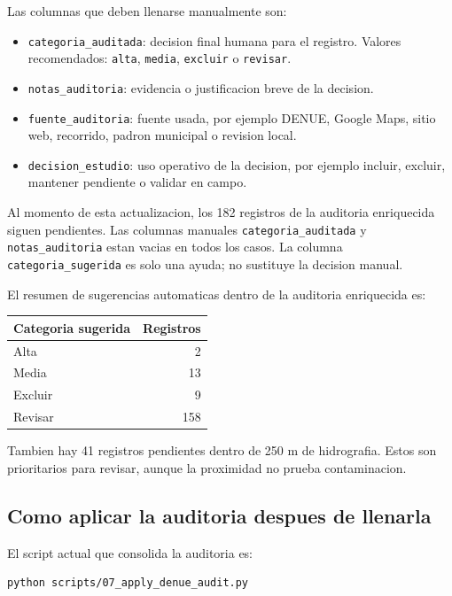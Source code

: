 \documentclass[11pt,letterpaper]{article}
\begin{document}
Las columnas que deben llenarse manualmente son:

\begin{itemize}
  \item \texttt{categoria\_auditada}: decision final humana para el registro. Valores recomendados: \texttt{alta}, \texttt{media}, \texttt{excluir} o \texttt{revisar}.
  \item \texttt{notas\_auditoria}: evidencia o justificacion breve de la decision.
  \item \texttt{fuente\_auditoria}: fuente usada, por ejemplo DENUE, Google Maps, sitio web, recorrido, padron municipal o revision local.
  \item \texttt{decision\_estudio}: uso operativo de la decision, por ejemplo incluir, excluir, mantener pendiente o validar en campo.
\end{itemize}

Al momento de esta actualizacion, los 182 registros de la auditoria enriquecida siguen pendientes. Las columnas manuales \texttt{categoria\_auditada} y \texttt{notas\_auditoria} estan vacias en todos los casos. La columna \texttt{categoria\_sugerida} es solo una ayuda; no sustituye la decision manual.

El resumen de sugerencias automaticas dentro de la auditoria enriquecida es:

\begin{longtable}{p{4cm}r}
\toprule
Categoria sugerida & Registros \\
\midrule
Alta & 2 \\
Media & 13 \\
Excluir & 9 \\
Revisar & 158 \\
\bottomrule
\end{longtable}

Tambien hay 41 registros pendientes dentro de 250 m de hidrografia. Estos son prioritarios para revisar, aunque la proximidad no prueba contaminacion.

\subsection{Como aplicar la auditoria despues de llenarla}

El script actual que consolida la auditoria es:

\begin{verbatim}
python scripts/07_apply_denue_audit.py
\end{verbatim}
\end{document}
